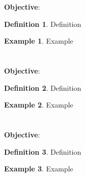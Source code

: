 \documentclass{report}
\theoremstyle{definition}
\newtheorem{example}{\bf Example}
\newtheorem{definition}{\bf Definition}[section]
\begin{document}
 \section{   }
 \indent\hfill\small\noindent \textbf{Objective}: \normalsize\\
 \setcounter{example}{0}
 \setcounter{definition}{0}
 \begin{definition}
     Definition
 \end{definition}
 \begin{example}
     Example
 \end{example}

\vfill
 \noindent{}
 \newpage

 \section{   }
 \indent\hfill\small\noindent \textbf{Objective}:  \normalsize\\
 \setcounter{example}{0}
 \setcounter{definition}{0}
 \begin{definition}
     Definition
 \end{definition}
 \begin{example}
     Example
 \end{example}

\vfill
 \noindent{}
 \newpage

 \section{   }
 \indent\hfill\small\noindent \textbf{Objective}:  \normalsize\\
 \setcounter{example}{0}
 \setcounter{definition}{0}
 \begin{definition}
     Definition
 \end{definition}
 \begin{example}
     Example
 \end{example}
\end{document}
